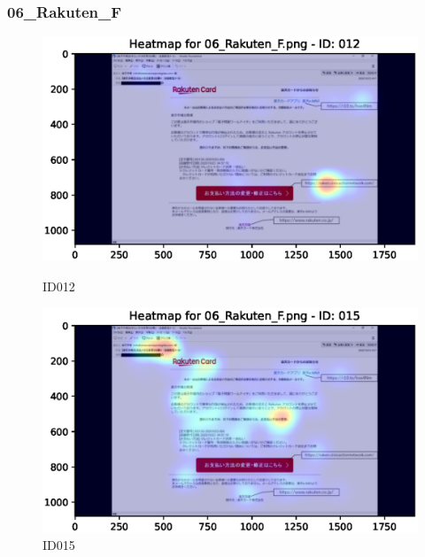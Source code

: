 \documentclass[a4paper,11pt]{ltjsreport}
\begin{document}
\subsubsection{06\_Rakuten\_F}
\begin{figure}[H]
	\centering
	\begin{minipage}[b]{0.49\textwidth}
		\centering
		\includegraphics[width=\linewidth]{img/output/ID012_heatmap_06_Rakuten_F.eps}
		\caption{ID012\label{fig:06012}}
	\end{minipage}
	\begin{minipage}[b]{0.49\textwidth}
		\centering
		\includegraphics[width=\linewidth]{img/output/ID015_heatmap_06_Rakuten_F.eps}
		\caption{ID015\label{fig:06015}}
	\end{minipage}
\end{figure}
\end{document}
